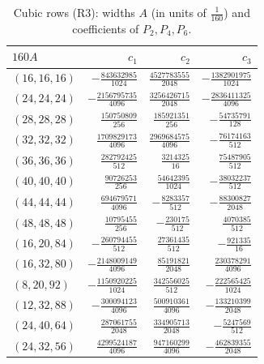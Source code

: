 \documentclass[11pt,colorlinks]{charlie}
\begin{document}
\begin{table}[ht]\centering\small
\caption{Cubic rows (R3): widths $A$ (in units of $\frac1{160}$) and coefficients of $P_2,P_4,P_6$.}\label{tab:cubic}
\begin{tabular}{@{}lrrr@{}}
\toprule
$160A$&$c_1$&$c_2$&$c_3$\\\midrule
$(16,16,16)$&$-\frac{843632985}{1024}$&$\frac{4527783555}{2048}$&$-\frac{1382901975}{1024}$\\[2pt]
$(24,24,24)$&$-\frac{2156795735}{4096}$&$\frac{3256426715}{2048}$&$-\frac{2836411325}{4096}$\\[2pt]
$(28,28,28)$&$\frac{150750809}{256}$&$\frac{185921351}{256}$&$-\frac{54735791}{128}$\\[2pt]
$(32,32,32)$&$\frac{1709829173}{4096}$&$\frac{2969684575}{4096}$&$-\frac{76174163}{512}$\\[2pt]
$(36,36,36)$&$\frac{282792425}{512}$&$\frac{3214325}{16}$&$\frac{75487905}{512}$\\[2pt]
$(40,40,40)$&$\frac{90726253}{256}$&$\frac{54642395}{1024}$&$-\frac{38032237}{512}$\\[2pt]
$(44,44,44)$&$\frac{694679571}{4096}$&$-\frac{8283357}{512}$&$-\frac{88300827}{2048}$\\[2pt]
$(48,48,48)$&$\frac{10795455}{256}$&$-\frac{230175}{512}$&$\frac{4070385}{512}$\\[2pt]
$(16,20,84)$&$-\frac{260794455}{512}$&$\frac{27361435}{512}$&$-\frac{921335}{16}$\\[2pt]
$(16,32,80)$&$-\frac{2148009149}{4096}$&$\frac{85191821}{2048}$&$\frac{230378291}{4096}$\\[2pt]
$(8,20,92)$&$-\frac{1150920225}{1024}$&$\frac{342556025}{512}$&$-\frac{222565425}{1024}$\\[2pt]
$(12,32,88)$&$-\frac{300094123}{4096}$&$\frac{500910361}{4096}$&$-\frac{133210399}{2048}$\\[2pt]
$(24,40,64)$&$\frac{287061755}{2048}$&$\frac{334905713}{2048}$&$-\frac{5247569}{512}$\\[2pt]
$(24,32,56)$&$\frac{4299524187}{4096}$&$\frac{947160299}{4096}$&$-\frac{462839355}{2048}$\\
\bottomrule
\end{tabular}
\end{table}
\end{document}
